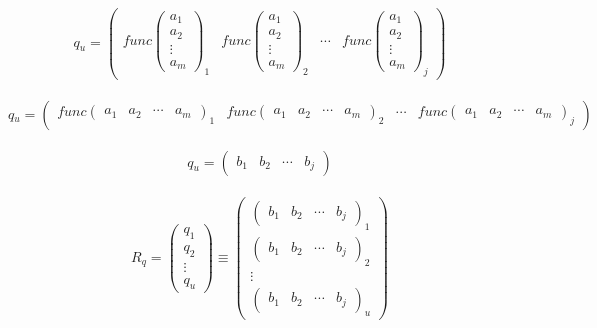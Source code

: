 \\
\[  \textit{q$_{u}$} = 
    \begin{pmatrix}
        \textit{func}\begin{pmatrix} a_{1}  \\  a_{2}  \\  \vdots   \\ a_{m} \end{pmatrix}_{1} & 
        \textit{func}\begin{pmatrix} a_{1}  \\  a_{2}  \\  \vdots   \\ a_{m} \end{pmatrix}_{2} & 
        \cdots &
        \textit{func}\begin{pmatrix} a_{1}  \\  a_{2}  \\  \vdots   \\ a_{m} \end{pmatrix}_{j}
    \end{pmatrix}   
\]
\\
\[  \textit{q$_{u}$} = 
    \begin{pmatrix}
        \textit{func}\begin{pmatrix} a_{1}  &  a_{2}  &  \cdots   & a_{m} \end{pmatrix}_{1} & 
        \textit{func}\begin{pmatrix} a_{1}  &  a_{2}  &  \cdots   & a_{m} \end{pmatrix}_{2} & 
        \cdots & 
        \textit{func}\begin{pmatrix} a_{1}  &  a_{2}  &  \cdots   & a_{m} \end{pmatrix}_{j}
    \end{pmatrix}
\]
\\
\[  \textit{q$_{u}$} = 
    \begin{pmatrix}
        b_{1}  &  b_{2}  &  \cdots   & b_{j} 
    \end{pmatrix}
\]
\\
\[ 
    \textit{R$_{q}$} = 
    \begin{pmatrix}
        q_{1}  \\  q_{2}  \\  \vdots \\ q_{u}
    \end{pmatrix}
    \equiv
    \begin{pmatrix}
        \begin{pmatrix}
            b_{1}  &  b_{2}  &  \cdots   & b_{j} 
        \end{pmatrix}_{1}\\
        \begin{pmatrix}
            b_{1}  &  b_{2}  &  \cdots   & b_{j} 
        \end{pmatrix}_{2}\\
        \vdots\\
        \begin{pmatrix}
            b_{1}  &  b_{2}  &  \cdots   & b_{j} 
        \end{pmatrix}_{u}
    \end{pmatrix}
\]
\pagebreak

